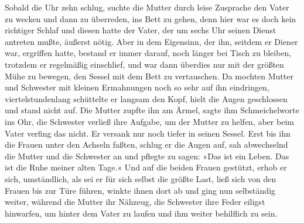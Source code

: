 Sobald die Uhr zehn schlug, suchte die Mutter durch leise Zusprache den
Vater zu wecken und dann zu überreden, ins Bett zu gehen, denn hier war
es doch kein richtiger Schlaf und diesen hatte der Vater, der um sechs
Uhr seinen Dienst antreten mußte, äußerst nötig. Aber in dem Eigensinn,
der ihn, seitdem er Diener war, ergriffen hatte, bestand er immer
darauf, noch länger bei Tisch zu bleiben, trotzdem er regelmäßig
einschlief, und war dann überdies nur mit der größten Mühe zu bewegen,
den Sessel mit dem Bett zu vertauschen. Da mochten Mutter und Schwester
mit kleinen Ermahnungen noch so sehr auf ihn eindringen,
viertelstundenlang schüttelte er langsam den Kopf, hielt die Augen
geschlossen und stand nicht auf. Die Mutter zupfte ihn am Ärmel, sagte
ihm Schmeichelworte ins Ohr, die Schwester verließ ihre Aufgabe, um der
Mutter zu helfen, aber beim Vater verfing das nicht. Er versank nur noch
tiefer in seinen Sessel. Erst bis ihn die Frauen unter den Achseln
faßten, schlug er die Augen auf, sah abwechselnd die Mutter und die
Schwester an und pflegte zu sagen: »Das ist ein Leben. Das ist die Ruhe
meiner alten Tage.« Und auf die beiden Frauen gestützt, erhob er sich,
umständlich, als sei er für sich selbst die größte Last, ließ sich von
den Frauen bis zur Türe führen, winkte ihnen dort ab und ging nun
selbständig weiter, während die Mutter ihr Nähzeug, die Schwester ihre
Feder eiligst hinwarfen, um hinter dem Vater zu laufen und ihm weiter
behilflich zu sein.

